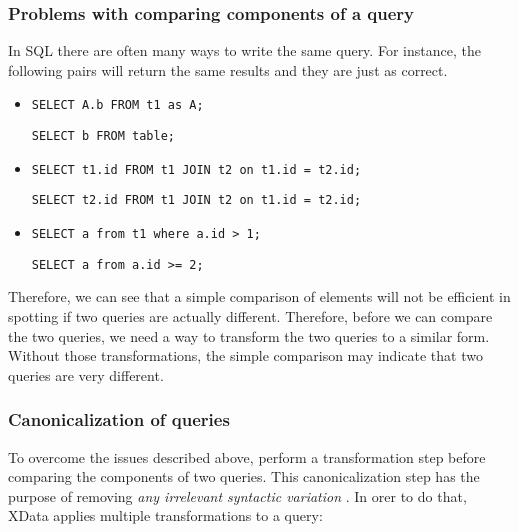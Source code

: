 \subsubsection{Problems with comparing components of a query}

In SQL there are often many ways to write the same query.
For instance, the following pairs will return the same results and they are
just as correct.

\begin{itemize}
  \item \texttt{SELECT A.b FROM t1 as A;}

  \texttt{SELECT b FROM table;}
  \item \texttt{SELECT t1.id FROM t1 JOIN t2 on t1.id = t2.id;}

  \texttt{SELECT t2.id FROM t1 JOIN t2 on t1.id = t2.id;}
  \item \texttt{SELECT a from t1 where a.id > 1;}

  \texttt{SELECT a from a.id >= 2;}
\end{itemize}

Therefore, we can see that a simple comparison of elements will not be efficient in spotting if two queries are actually different. Therefore, before we can compare the two queries, we need a way to transform the two queries to a similar form. Without those transformations, the simple comparison may indicate
that two queries are very different.

\subsubsection{Canonicalization of queries}

To overcome the issues described above, \cite{literature:xdata} perform a transformation step before comparing the components of two queries. This canonicalization step has the purpose of removing \textit{any irrelevant syntactic variation} \citep{literature:xdata}. In orer to do that, XData applies multiple transformations to a query:

